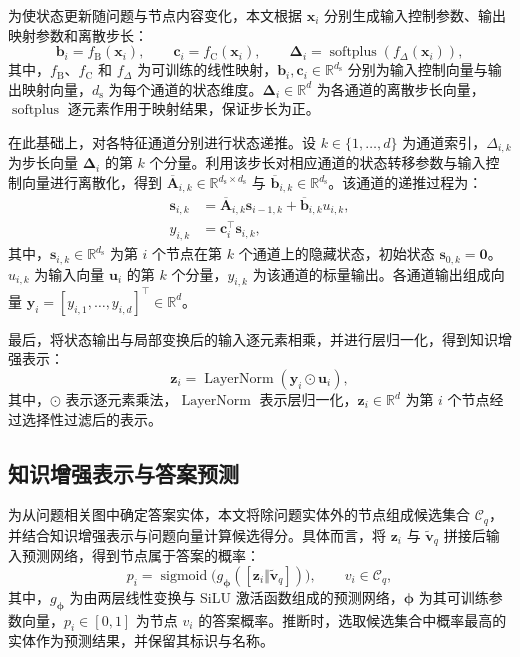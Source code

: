 为使状态更新随问题与节点内容变化，本文根据 $\bm{x}_i$ 分别生成输入控制参数、输出映射参数和离散步长：
\begin{equation}
\bm{b}_i=f_{\mathrm{B}}(\bm{x}_i),\qquad
\bm{c}_i=f_{\mathrm{C}}(\bm{x}_i),\qquad
\bm{\Delta}_i=\operatorname{softplus}(f_{\Delta}(\bm{x}_i)),
\end{equation}
其中，$f_{\mathrm{B}}$、$f_{\mathrm{C}}$ 和 $f_{\Delta}$ 为可训练的线性映射，$\bm{b}_i,\bm{c}_i\in\mathbb{R}^{d_{\mathrm{s}}}$ 分别为输入控制向量与输出映射向量，$d_{\mathrm{s}}$ 为每个通道的状态维度。$\bm{\Delta}_i\in\mathbb{R}^{d}$ 为各通道的离散步长向量，$\operatorname{softplus}$ 逐元素作用于映射结果，保证步长为正。

在此基础上，对各特征通道分别进行状态递推。设 $k\in\{1,\ldots,d\}$ 为通道索引，$\Delta_{i,k}$ 为步长向量 $\bm{\Delta}_i$ 的第 $k$ 个分量。利用该步长对相应通道的状态转移参数与输入控制向量进行离散化，得到 $\overline{\bm{A}}_{i,k}\in\mathbb{R}^{d_{\mathrm{s}}\times d_{\mathrm{s}}}$ 与 $\overline{\bm{b}}_{i,k}\in\mathbb{R}^{d_{\mathrm{s}}}$。该通道的递推过程为：
\begin{equation}
\begin{aligned}
\bm{s}_{i,k}
&=\overline{\bm{A}}_{i,k}\bm{s}_{i-1,k}
+\overline{\bm{b}}_{i,k}u_{i,k},\\
y_{i,k}&=\bm{c}_i^{\top}\bm{s}_{i,k},
\end{aligned}
\end{equation}
其中，$\bm{s}_{i,k}\in\mathbb{R}^{d_{\mathrm{s}}}$ 为第 $i$ 个节点在第 $k$ 个通道上的隐藏状态，初始状态 $\bm{s}_{0,k}=\bm{0}$。$u_{i,k}$ 为输入向量 $\bm{u}_i$ 的第 $k$ 个分量，$y_{i,k}$ 为该通道的标量输出。各通道输出组成向量 $\bm{y}_i=[y_{i,1},\ldots,y_{i,d}]^{\top}\in\mathbb{R}^{d}$。

最后，将状态输出与局部变换后的输入逐元素相乘，并进行层归一化，得到知识增强表示：
\begin{equation}
\bm{z}_i=\operatorname{LayerNorm}(\bm{y}_i\odot\bm{u}_i),
\end{equation}
其中，$\odot$ 表示逐元素乘法，$\operatorname{LayerNorm}$ 表示层归一化，$\bm{z}_i\in\mathbb{R}^{d}$ 为第 $i$ 个节点经过选择性过滤后的表示。

\subsection{知识增强表示与答案预测}

为从问题相关图中确定答案实体，本文将除问题实体外的节点组成候选集合 $\mathcal{C}_q$，并结合知识增强表示与问题向量计算候选得分。具体而言，将 $\bm{z}_i$ 与 $\widetilde{\bm{v}}_q$ 拼接后输入预测网络，得到节点属于答案的概率：
\begin{equation}
p_i=\operatorname{sigmoid}\bigl(g_{\bm{\phi}}([\bm{z}_i\Vert\widetilde{\bm{v}}_q])\bigr),\qquad v_i\in\mathcal{C}_q,
\end{equation}
其中，$g_{\bm{\phi}}$ 为由两层线性变换与 SiLU 激活函数组成的预测网络，$\bm{\phi}$ 为其可训练参数向量，$p_i\in[0,1]$ 为节点 $v_i$ 的答案概率。推断时，选取候选集合中概率最高的实体作为预测结果，并保留其标识与名称。

